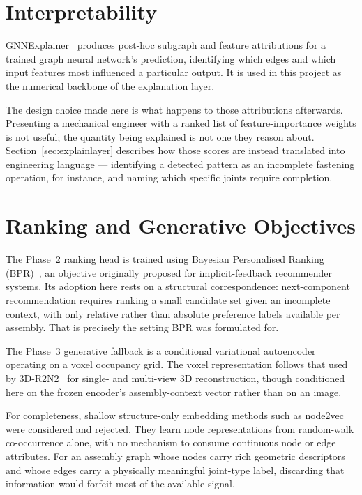 \documentclass[12pt,oneside,a4paper]{report}
\begin{document}
\section{Interpretability}

GNNExplainer~\cite{ying2019gnnexplainer} produces post-hoc subgraph and
feature attributions for a trained graph neural network's prediction,
identifying which edges and which input features most influenced a particular
output. It is used in this project as the numerical backbone of the
explanation layer.

The design choice made here is what happens to those attributions afterwards.
Presenting a mechanical engineer with a ranked list of feature-importance
weights is not useful; the quantity being explained is not one they reason
about. Section~\ref{sec:explainlayer} describes how those scores are instead
translated into engineering language --- identifying a detected pattern as an
incomplete fastening operation, for instance, and naming which specific
joints require completion.

\section{Ranking and Generative Objectives}

The Phase~2 ranking head is trained using Bayesian Personalised Ranking
(BPR)~\cite{rendle2009bpr}, an objective originally proposed for
implicit-feedback recommender systems. Its adoption here rests on a
structural correspondence: next-component recommendation requires ranking a
small candidate set given an incomplete context, with only relative rather
than absolute preference labels available per assembly. That is precisely the
setting BPR was formulated for.

The Phase~3 generative fallback is a conditional variational
autoencoder~\cite{kingma2014vae} operating on a voxel occupancy grid. The
voxel representation follows that used by 3D-R2N2~\cite{choy2016occupancy}
for single- and multi-view 3D reconstruction, though conditioned here on the
frozen encoder's assembly-context vector rather than on an image.

For completeness, shallow structure-only embedding methods such as
node2vec~\cite{grover2016node2vec} were considered and rejected. They learn
node representations from random-walk co-occurrence alone, with no mechanism
to consume continuous node or edge attributes. For an assembly graph whose
nodes carry rich geometric descriptors and whose edges carry a physically
meaningful joint-type label, discarding that information would forfeit most
of the available signal.
\end{document}
